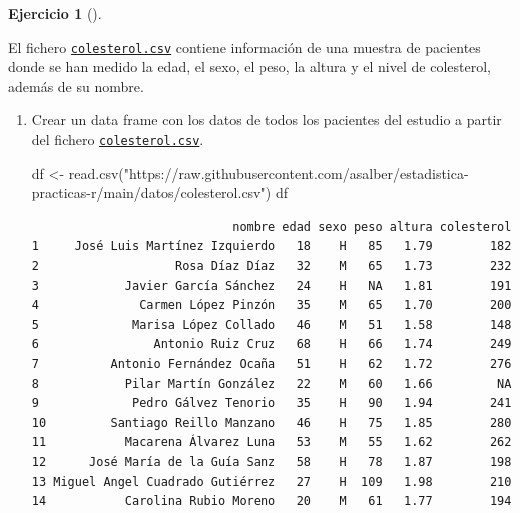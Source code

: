 \documentclass[
  a4paper,
]{scrreport}
\newenvironment{Shaded}{\begin{snugshade}}{\end{snugshade}}
\newcommand{\FunctionTok}[1]{\textcolor[rgb]{0.28,0.35,0.67}{#1}}
\newcommand{\NormalTok}[1]{\textcolor[rgb]{0.00,0.23,0.31}{#1}}
\newcommand{\OtherTok}[1]{\textcolor[rgb]{0.00,0.23,0.31}{#1}}
\newcommand{\StringTok}[1]{\textcolor[rgb]{0.13,0.47,0.30}{#1}}
\theoremstyle{definition}
\newtheorem{exercise}{Ejercicio}[chapter]
\theoremstyle{remark}
\begin{document}
\begin{exercise}[]\protect\hypertarget{exr-descriptiva-2}{}\label{exr-descriptiva-2}

El fichero \href{datos/colesterol.csv}{\texttt{colesterol.csv}} contiene
información de una muestra de pacientes donde se han medido la edad, el
sexo, el peso, la altura y el nivel de colesterol, además de su nombre.

\begin{enumerate}
\def\labelenumi{\alph{enumi}.}
\item
  Crear un data frame con los datos de todos los pacientes del estudio a
  partir del fichero
  \href{datos/colesterol.csv}{\texttt{colesterol.csv}}.

  \begin{tcolorbox}[enhanced jigsaw, toprule=.15mm, rightrule=.15mm, arc=.35mm, colback=white, colbacktitle=quarto-callout-tip-color!10!white, toptitle=1mm, left=2mm, colframe=quarto-callout-tip-color-frame, opacityback=0, breakable, opacitybacktitle=0.6, bottomtitle=1mm, titlerule=0mm, title=\textcolor{quarto-callout-tip-color}{\faLightbulb}\hspace{0.5em}{Solución}, bottomrule=.15mm, coltitle=black, leftrule=.75mm]

\begin{Shaded}
\begin{Highlighting}[]
\NormalTok{df }\OtherTok{\textless{}{-}} \FunctionTok{read.csv}\NormalTok{(}\StringTok{"https://raw.githubusercontent.com/asalber/estadistica{-}practicas{-}r/main/datos/colesterol.csv"}\NormalTok{)}
\NormalTok{df}
\end{Highlighting}
\end{Shaded}

\begin{verbatim}
                            nombre edad sexo peso altura colesterol
1     José Luis Martínez Izquierdo   18    H   85   1.79        182
2                   Rosa Díaz Díaz   32    M   65   1.73        232
3            Javier García Sánchez   24    H   NA   1.81        191
4              Carmen López Pinzón   35    M   65   1.70        200
5             Marisa López Collado   46    M   51   1.58        148
6                Antonio Ruiz Cruz   68    H   66   1.74        249
7          Antonio Fernández Ocaña   51    H   62   1.72        276
8            Pilar Martín González   22    M   60   1.66         NA
9             Pedro Gálvez Tenorio   35    H   90   1.94        241
10         Santiago Reillo Manzano   46    H   75   1.85        280
11           Macarena Álvarez Luna   53    M   55   1.62        262
12      José María de la Guía Sanz   58    H   78   1.87        198
13 Miguel Angel Cuadrado Gutiérrez   27    H  109   1.98        210
14           Carolina Rubio Moreno   20    M   61   1.77        194
\end{verbatim}


\end{tcolorbox}
\end{enumerate}
\end{exercise}
\end{document}
